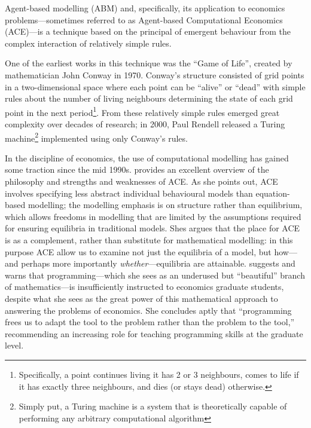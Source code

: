 \documentclass[12pt]{article}
\numberwithin{equation}{subsection}
\begin{document}
Agent-based modelling (ABM) and, specifically, its application to economics problems---sometimes
referred to as Agent-based Computational Economics (ACE)---is a technique based on the principal of
emergent behaviour from the complex interaction of relatively simple rules.

One of the earliest works in this technique was the ``Game of Life'', created by mathematician John
Conway in 1970.  Conway's structure consisted of grid points in a two-dimensional space where each
point can be ``alive'' or ``dead'' with simple rules about the number of living neighbours
determining the state of each grid point in the next period\footnote{Specifically, a point continues
living it has 2 or 3 neighbours, comes to life if it has exactly three neighbours, and dies (or
stays dead) otherwise.}.  From these relatively simple rules emerged great complexity over decades
of research; in 2000, Paul Rendell released a Turing machine\footnote{Simply put, a Turing machine
is a system that is theoretically capable of performing any arbitrary computational algorithm}
implemented using only Conway's rules.

In the discipline of economics, the use of computational modelling has gained some traction since
the mid 1990s.  \citet{hce:Tesf} provides an excellent overview of the philosophy and strengths and
weaknesses of ACE.  As she points out, ACE involves specifying less abstract individual behavioural
models than equation-based modelling; the modelling emphasis is on structure rather than equilibrium,
which allows freedoms in modelling that are limited by the assumptions required for ensuring
equilibria in traditional models.  Shes argues that the place for ACE is as a complement, rather
than substitute for mathematical modelling: in this purpose ACE allow us to examine not just the
equilibria of a model, but how---and perhaps more importantly \emph{whether}---equilibria are
attainable.  \citeauthor{hce:Tesf} suggests and warns that programming---which she sees as an
underused but ``beautiful'' branch of mathematics---is insufficiently instructed to economics
graduate students, despite what she sees as the great power of this mathematical approach to
answering the problems of economics.  She concludes aptly that ``programming frees us to adapt the tool to
the problem rather than the problem to the tool,'' recommending an increasing role for teaching
programming skills at the graduate level.
\end{document}
